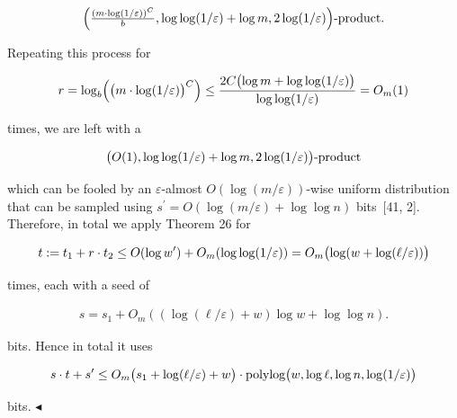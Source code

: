 \documentclass[10pt,a4paper]{article}
\begin{document}
\[\begin{gathered}
\Bigl{(}\tfrac{(m\cdot\log(1/\varepsilon))^{C}}{b},\log\log(1/\varepsilon)+\log m,2\log(1/\varepsilon)\Bigr{)}\text{-product.}
\end{gathered}\]


Repeating this process for\par


\[\begin{gathered}
\displaystyle r=\log_{b}\Bigl{(}\bigl{(}m\cdot\log(1/\varepsilon)\bigr{)}^{C}\Bigr{)}\leq\frac{2C\bigl{(}\log m+\log\log(1/\varepsilon)\bigr{)}}{\log\log(1/\varepsilon)}=O_{m}(1)
\end{gathered}\]


times, we are left with a\par


\[\begin{gathered}
\bigl{(}O(1),\log\log(1/\varepsilon)+\log m,2\log(1/\varepsilon)\bigr{)}\text{-product}
\end{gathered}\]


which can be fooled by an $\varepsilon$-almost $O(\log(m/\varepsilon))$-wise uniform distribution that can be sampled using $s^{\prime}=O(\log(m/\varepsilon)+\log\log n)$ bits [41, 2].
Therefore, in total we apply Theorem 26 for\par


\[\begin{gathered}
\displaystyle t:=t_{1}+r\cdot t_{2}\leq O(\log w^{\prime})+O_{m}(\log\log(1/\varepsilon))=O_{m}\bigl{(}\log(w+\log(\ell/\varepsilon))\bigr{)}
\end{gathered}\]


times, each with a seed of\par


\[\begin{gathered}
s=s_{1}+O_{m}((\log(\ell/\varepsilon)+w)\log w+\log\log n).
\end{gathered}\]


bits.
Hence in total it uses\par


\[\begin{gathered}
\displaystyle s\cdot t+s^{\prime} \displaystyle\leq O_{m}\bigl{(}s_{1}+\log(\ell/\varepsilon)+w\bigr{)}\cdot\textnormal{polylog}\bigl{(}w,\log\ell,\log n,\log(1/\varepsilon)\bigr{)}
\end{gathered}\]


bits.
$\blacktriangleleft$\par
\end{document}
